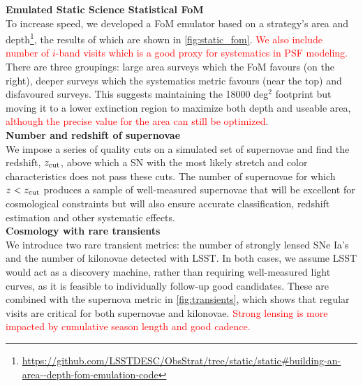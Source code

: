 \documentclass[12pt, letterpaper]{article}
\newcommand{\review}[1]{{\textcolor{red}{#1}}}
\begin{document}
{\bfseries Emulated Static Science Statistical FoM}\\
To increase speed, %
we developed a FoM emulator based on a strategy's area and depth\footnote{\url{https://github.com/LSSTDESC/ObsStrat/tree/static/static#building-an-area--depth-fom-emulation-code}}, the results of which are shown in \autoref{fig:static_fom}. \review{We also include number of $i$-band visits which is a good proxy for systematics in PSF modeling.} There are three %
groupings: large area surveys which the FoM favours (on the right), deeper surveys which the systematics metric favours (near the top) and disfavoured surveys. This suggests maintaining the 18000 %
deg$^2$ footprint but moving it to a lower extinction region to maximize both depth and useable area, \review{although the precise value for the area can still be optimized}.\\ 

{\bfseries Number and redshift of supernovae}\\
We impose a series of quality cuts on a simulated set of supernovae and find the redshift, $z_{\rm{cut}}$, above which a SN with the most likely stretch and color characteristics does not pass these cuts. The number of supernovae for which $z<z_{\rm{cut}}$ produces a sample of well-measured supernovae that will be excellent for cosmological constraints but will also ensure accurate classification, redshift estimation and other systematic effects.\\

{\bfseries Cosmology with rare transients}\\
We introduce two rare transient metrics: the number of strongly lensed SNe Ia's and the number of kilonovae detected with LSST. In both cases, we assume LSST would act as a discovery machine, rather than requiring well-measured light curves, as it is feasible to individually follow-up good candidates. These are combined with the supernova metric in \autoref{fig:transients}, which shows that regular visits are critical for both supernovae and kilonovae. \review{Strong lensing is more impacted by cumulative season length and good cadence.}\\ 
\end{document}
